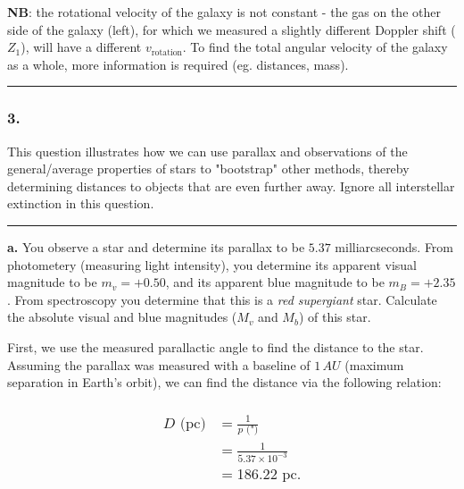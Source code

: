 \documentclass[
]{article}
\begin{document}
\textbf{NB}: the rotational velocity of the galaxy is not constant - the
gas on the other side of the galaxy (left), for which we measured a
slightly different Doppler shift ({\(Z_{1}\)}), will have a different
{\(v_{\text{rotation}}\)}. To find the total angular velocity of the
galaxy as a whole, more information is required (eg. distances, mass).

\begin{center}\rule{0.5\linewidth}{0.5pt}\end{center}

\hypertarget{section}{%
\subsubsection{3.}\label{section}}

This question illustrates how we can use parallax and observations of
the general/average properties of stars to "bootstrap" other methods,
thereby determining distances to objects that are even further away.
Ignore all interstellar extinction in this question.

\begin{center}\rule{0.5\linewidth}{0.5pt}\end{center}

\textbf{a.} You observe a star and determine its parallax to be
{\(5.37\)} milliarcseconds. From photometery (measuring light
intensity), you determine its apparent visual magnitude to be
{\(m_{v} = + 0.50\)}, and its apparent blue magnitude to be
{\(m_{B} = + 2.35\)}. From spectroscopy you determine that this is a
\emph{red supergiant} star. Calculate the absolute visual and blue
magnitudes ({\(M_{v}\)} and {\(M_{b}\)}) of this star.

First, we use the measured parallactic angle to find the distance to the
star. Assuming the parallax was measured with a baseline of {\(1\, AU\)}
(maximum separation in Earth's orbit), we can find the distance via the
following relation:

\hypertarget{beginmatrix-dtextpc-frac1ptext-frac15.37-times-10--3-186.22textpc.-endmatrix}{%
\subsubsection{\texorpdfstring{{\[\begin{matrix}
{D\text{~(pc)}} & {= \frac{1}{p\text{~(")}}} \\
 & {= \frac{1}{5.37 \times 10^{- 3}}} \\
 & {= 186.22\text{~pc}.} \\
\end{matrix}\]}}{\textbackslash begin\{matrix\}
\{D\textbackslash text\{\textasciitilde(pc)\}\} \& \{= \textbackslash frac\{1\}\{p\textbackslash text\{\textasciitilde(")\}\}\} \textbackslash\textbackslash{}
 \& \{= \textbackslash frac\{1\}\{5.37 \textbackslash times 10\^{}\{- 3\}\}\} \textbackslash\textbackslash{}
 \& \{= 186.22\textbackslash text\{\textasciitilde pc\}.\} \textbackslash\textbackslash{}
\textbackslash end\{matrix\}}}\label{beginmatrix-dtextpc-frac1ptext-frac15.37-times-10--3-186.22textpc.-endmatrix}}
\end{document}
